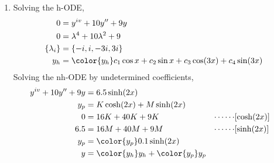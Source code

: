 \begin{enumerate}
    \item Solving the h-ODE,
          \begin{align}
              0               & = y^{iv} + 10y'' + 9y                                \\
              0               & = \lambda^{4} + 10\lambda^{2} + 9                    \\
              \{\lambda_{i}\} & = \{-i, i, -3i, 3i\}                                 \\
              y_{h}           & = \color{y_h} c_1 \cos x + c_2 \sin x + c_3 \cos(3x)
              + c_4 \sin(3x)
          \end{align}
          Solving the nh-ODE by undetermined coefficients,
          \begin{align}
              y^{iv} + 10y'' + 9y & = 6.5\sinh(2x)                                \\
              y_{p}               & = K\cosh(2x) + M\sinh(2x)                     \\
              0                   & = 16K + 40K + 9K                            &
              \cdots\cdots        & [\cosh(2x)]                                   \\
              6.5                 & = 16M + 40M + 9M                            &
              \cdots\cdots        & [\sinh(2x)]                                   \\
              y_{p}               & = \color{y_p} 0.1\sinh(2x)                    \\
              y                   & = {\color{y_h} y_{h}} + {\color{y_p} y_{p}}
          \end{align}


\end{enumerate}
